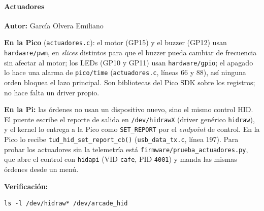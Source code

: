 \paragraph{Actuadores}
\textbf{Autor:} García Olvera Emiliano

\textbf{En la Pico} (\texttt{actuadores.c}): el motor (GP15) y el buzzer (GP12) usan \texttt{hardware/pwm}, en
\textit{slices} distintos para que el buzzer pueda cambiar de frecuencia sin afectar al motor; los LEDs (GP10 y GP11)
usan \texttt{hardware/gpio}; el apagado lo hace una alarma de \texttt{pico/time} (\texttt{actuadores.c}, líneas 66 y 88),
así ninguna orden bloquea el lazo principal. Son bibliotecas del Pico SDK sobre los registros; no hace falta un driver propio.

\textbf{En la Pi:} las órdenes no usan un dispositivo nuevo, sino el mismo control HID. El puente escribe el reporte de
salida en \texttt{/dev/hidrawX} (driver genérico \texttt{hidraw}), y el kernel lo entrega a la Pico como
\texttt{SET\_REPORT} por el \textit{endpoint} de control. En la Pico lo recibe \texttt{tud\_hid\_set\_report\_cb()}
(\texttt{usb\_data\_tx.c}, línea 197). Para probar los actuadores sin la telemetría está
\texttt{firmware/prueba\_actuadores.py}, que abre el control con \texttt{hidapi} (VID \texttt{cafe}, PID \texttt{4001}) y manda
las mismas órdenes desde un menú.

\textbf{Verificación:}
\begin{lstlisting}
ls -l /dev/hidraw* /dev/arcade_hid
\end{lstlisting}

